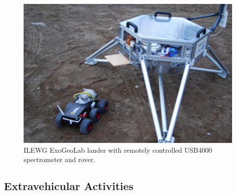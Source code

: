 \documentclass[preprint]{elsarticle}
\begin{document}
\begin{figure}
\centering
\includegraphics{img/figure01.png}
\caption{ILEWG ExoGeoLab lander with remotely controlled USB4000 spectrometer and rover.}
\end{figure}

\subsection{Extravehicular Activities}
\end{document}
